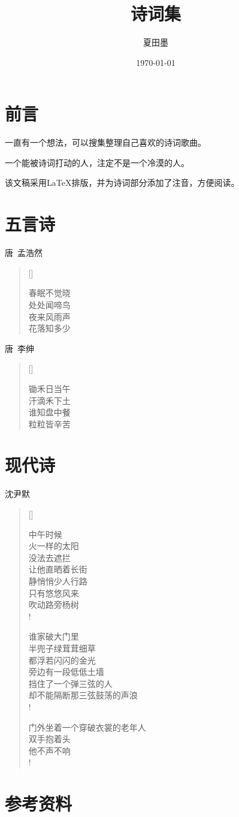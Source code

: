 \documentclass[twoside]{book}
\title{诗词集}
\author{夏田墨}
\date{\today}
\newenvironment{poem}[3]%
{
    \poemtitle{#1}
    {#2}
    \begin{pinyinscope}
    \large
    \settowidth{\versewidth}{#3}
    \begin{verse}[\versewidth]
}
{\end{verse}\end{pinyinscope}}
\begin{document}
\frontmatter
\maketitle  %
\tableofcontents

\chapter{前言}
一直有一个想法，可以搜集整理自己喜欢的诗词歌曲。

一个能被诗词打动的人，注定不是一个冷漠的人。

该文稿采用\LaTeX 排版，并为诗词部分添加了注音，方便阅读。


\mainmatter

\chapter{五言诗}


\begin{poem}{春晓}{唐~孟浩然}{春眠不觉晓}
春眠不觉晓 \\
处处闻啼鸟 \\
夜来风雨声 \\
花落知多少 \\
\end{poem}

\begin{poem}{悯农}{唐~李绅}{锄禾日当午}
锄禾日当午 \\
汗滴禾下土 \\
谁知盘中餐 \\
粒粒皆辛苦 \\
\end{poem}


\chapter{现代诗}

\begin{poem}{三弦}{沈尹默}{旁边有一段低低土墙}
中午时候 \\
火一样的太阳 \\
没法去遮拦 \\
让他直晒着长街 \\
静悄悄少人行路 \\
只有悠悠风来 \\
吹动路旁杨树 \\!

谁家破大门里 \\
半兜子绿茸茸细草 \\
都浮若闪闪的金光 \\
旁边有一段低低土墙 \\
挡住了一个弹三弦的人 \\
却不能隔断那三弦鼓荡的声浪 \\!

门外坐着一个穿破衣裳的老年人 \\
双手抱着头 \\
他不声不响 \\!
\end{poem}

\backmatter
\chapter{参考资料}
\end{document}
